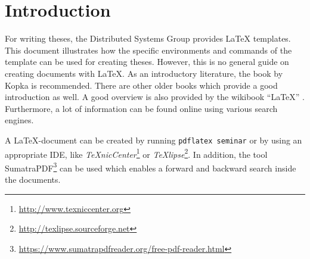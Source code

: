 %
\section{Introduction}
%
For writing theses, the Distributed Systems Group provides LaTeX templates.
This document illustrates how the specific environments and commands of the template can be used for creating theses.
However, this is no general guide on creating documents with \LaTeX.
As an introductory literature, the book by Kopka \cite{Kopka2003} is recommended.
There are other older books which provide a good introduction as well.
A good overview is also provided by the wikibook "`\LaTeX"' \cite{lat12}.
Furthermore, a lot of information can be found online using various search engines.

A \LaTeX-document can be created by running \texttt{pdflatex seminar} or by using an appropriate IDE, like \textit{TeXnicCenter}\footnote{\url{http://www.texniccenter.org}} or \textit{TeXlipse}\footnote{\url{http://texlipse.sourceforge.net}}.
In addition, the tool SumatraPDF\footnote{\url{https://www.sumatrapdfreader.org/free-pdf-reader.html}} can be used which enables a forward and backward search inside the documents.